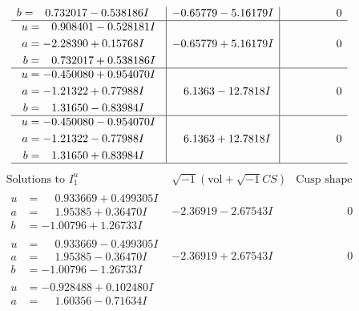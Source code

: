 \documentclass[1p]{elsarticle_modified}
\theoremstyle{definition}
\newcommand{\I}{\sqrt{-1}}
\begin{document}
$$\begin{array}{c|c|c}
\begin{aligned}
b &= \phantom{-}0.732017 - 0.538186 I\end{aligned}
 & -0.65779 - 5.16179 I & \phantom{-0.000000 } 0 \\ \hline\begin{aligned}
u &= \phantom{-}0.908401 - 0.528181 I \\
a &= -2.28390 + 0.15768 I \\
b &= \phantom{-}0.732017 + 0.538186 I\end{aligned}
 & -0.65779 + 5.16179 I & \phantom{-0.000000 } 0 \\ \hline\begin{aligned}
u &= -0.450080 + 0.954070 I \\
a &= -1.21322 + 0.77988 I \\
b &= \phantom{-}1.31650 - 0.83984 I\end{aligned}
 & \phantom{-}6.1363 - 12.7818 I & \phantom{-0.000000 } 0 \\ \hline\begin{aligned}
u &= -0.450080 - 0.954070 I \\
a &= -1.21322 - 0.77988 I \\
b &= \phantom{-}1.31650 + 0.83984 I\end{aligned}
 & \phantom{-}6.1363 + 12.7818 I & \phantom{-0.000000 } 0\\
 \hline 
 \end{array}$$\newpage$$\begin{array}{c|c|c}  
\text{Solutions to }I^u_{1}& \I (\text{vol} + \sqrt{-1}CS) & \text{Cusp shape}\\
 \hline 
\begin{aligned}
u &= \phantom{-}0.933669 + 0.499305 I \\
a &= \phantom{-}1.95385 + 0.36470 I \\
b &= -1.00796 + 1.26733 I\end{aligned}
 & -2.36919 - 2.67543 I & \phantom{-0.000000 } 0 \\ \hline\begin{aligned}
u &= \phantom{-}0.933669 - 0.499305 I \\
a &= \phantom{-}1.95385 - 0.36470 I \\
b &= -1.00796 - 1.26733 I\end{aligned}
 & -2.36919 + 2.67543 I & \phantom{-0.000000 } 0 \\ \hline\begin{aligned}
u &= -0.928488 + 0.102480 I \\
a &= \phantom{-}1.60356 - 0.71634 I \\

\end{aligned}
\end{array}$$
\end{document}
